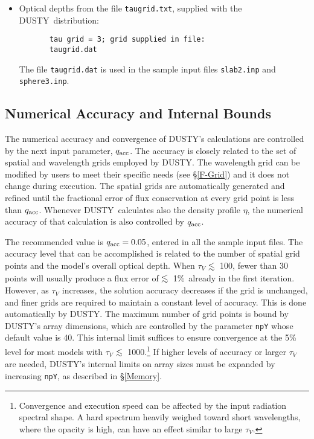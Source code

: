 \documentclass[12pt]{article} \usepackage{epsf}
\def\D  {{\sf DUSTY}}
\def\laa    {\mathrel{\hbox{\raise.3ex\hbox{$<$}\llap
                                {\lower.8ex\hbox{$\sim$}}}}}
\def\la     {\hbox{$\laa$}}
\def\tV     {\hbox{$\tau_V$}}
\begin{document}
\begin{enumerate}
\begin{itemize}
\item Optical depths from the file {\tt taugrid.txt}, supplied with the \D\
distribution:
\begin{verbatim}
       tau grid = 3; grid supplied in file:
       taugrid.dat
\end{verbatim}
The file {\tt taugrid.dat} is used in the sample input files {\tt slab2.inp}
and {\tt sphere3.inp}.
\end{itemize}
\end{enumerate}

\subsection{Numerical Accuracy and Internal Bounds}
\label{numerics}

The numerical accuracy and convergence of \D's calculations are controlled by
the next input parameter, $q_{\rm acc}$. The accuracy is closely related to the
set of spatial and wavelength grids employed by \D. The wavelength grid can be
modified by users to meet their specific needs (see \S\ref{F-Grid}) and it does
not change during execution. The spatial grids are automatically generated and
refined until the fractional error of flux conservation at every grid point is
less than $q_{\rm acc}$. Whenever \D\ calculates also the density profile
$\eta$, the numerical accuracy of that calculation is also controlled by
$q_{\rm acc}$.

The recommended value is $q_{\rm acc} = 0.05$, entered in all the sample input
files. The accuracy level that can be accomplished is related to the number of
spatial grid points and the model's overall optical depth.  When $\tau_V$ \la\
100, fewer than 30 points will usually produce a flux error of \la\ 1\%\
already in the first iteration. However, as $\tau_V$ increases, the solution
accuracy decreases if the grid is unchanged, and finer grids are required to
maintain a constant level of accuracy.  This is done automatically by \D.  The
maximum number of grid points is bound by \D's array dimensions, which are
controlled by the parameter {\tt npY} whose default value is 40. This internal
limit suffices to ensure convergence at the 5\% level for most models with
$\tau_V$ \la\ 1000.\footnote{Convergence and execution speed can be affected by
the input radiation spectral shape.  A hard spectrum heavily weighed toward
short wavelengths, where the opacity is high, can have an effect similar to
large \tV.} If higher levels of accuracy or larger $\tau_V$ are needed, \D's
internal limits on array sizes must be expanded by increasing {\tt npY}, as
described in \S\ref{Memory}.
\end{document}

